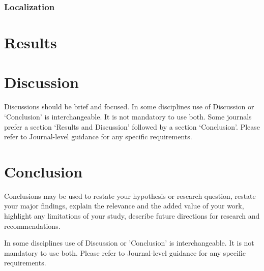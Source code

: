 \documentclass[pdflatex,sn-mathphys]{sn-jnl}%
\theoremstyle{thmstyleone}%
\theoremstyle{thmstyletwo}%
\theoremstyle{thmstylethree}%
\begin{document}
\subsubsection{Localization}\label{subsubsec3}

\section{Results}\label{sec3}

\section{Discussion}\label{sec12}

Discussions should be brief and focused. In some disciplines use of Discussion or `Conclusion' is interchangeable. It is not mandatory to use both. Some journals prefer a section `Results and Discussion' followed by a section `Conclusion'. Please refer to Journal-level guidance for any specific requirements. 

\section{Conclusion}\label{sec13}

Conclusions may be used to restate your hypothesis or research question, restate your major findings, explain the relevance and the added value of your work, highlight any limitations of your study, describe future directions for research and recommendations. 

In some disciplines use of Discussion or 'Conclusion' is interchangeable. It is not mandatory to use both. Please refer to Journal-level guidance for any specific requirements. 

\backmatter
\end{document}

